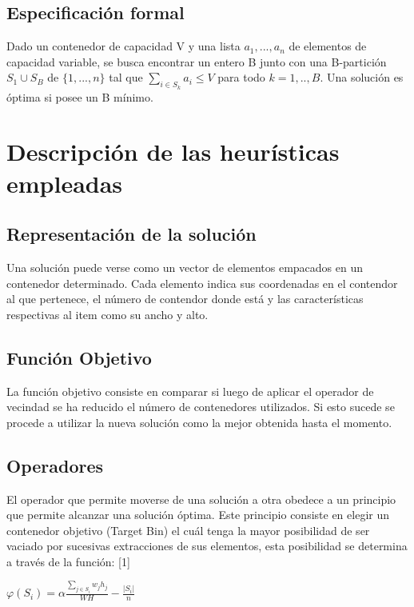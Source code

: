 \documentclass[a4paper,10pt]{article}
\begin{document}
\subsection{Especificación formal}

Dado un contenedor de capacidad V y una lista $a_1, ..., a_n$ de elementos de capacidad variable, se busca encontrar un entero 
B junto con una B-partición $S_1 \cup S_B$ de $\{1,...,n\}$ tal que $\sum_{i \in S_k}^{} {a_i \le V}$ para todo $k = 1,..,B$. 
Una solución es óptima si posee un B mínimo. 

\section{Descripción de las heurísticas empleadas}

\subsection{Representación de la solución}

Una solución puede verse como un vector de elementos empacados en un contenedor determinado. Cada elemento indica 
sus coordenadas en el contendor al que pertenece, el número de contendor donde está y las características respectivas al 
item como su ancho y alto. 

\subsection{Función Objetivo}
La función objetivo consiste en comparar si luego de aplicar el operador de vecindad se ha reducido el número de contenedores 
utilizados. Si esto sucede se procede a utilizar la nueva solución como la mejor obtenida hasta el momento.

\subsection{Operadores}
El operador que permite moverse de una solución a otra obedece a un principio que permite alcanzar una solución óptima. Este principio 
consiste en elegir un contenedor objetivo (Target Bin) el cuál tenga la mayor posibilidad de ser vaciado por sucesivas extracciones de 
sus elementos, esta posibilidad se determina a través de la función: [1]

\begin{center}
$\varphi(S_i) = \alpha \frac{\sum_{j \in S_i} {w_j h_j}}{W H} - \frac{|S_i|}{n}$
\end{center}
\end{document}

